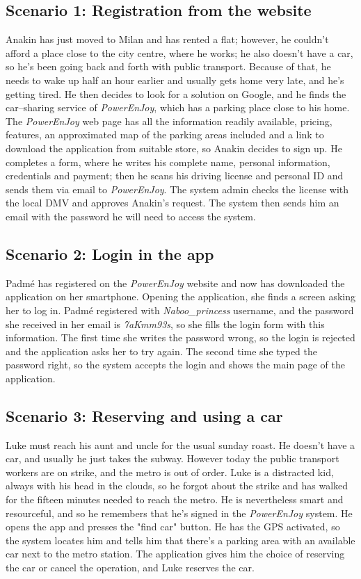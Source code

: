 \subsection{Scenario 1: Registration from the website}
	Anakin has just moved to Milan and has rented a flat; however, he couldn't afford a place close to the city centre, where he works; he also doesn't have a car, so he's been going back and forth with public transport. Because of that, he needs to wake up half an hour earlier and usually gets home very late, and he's getting tired. He then decides to look for a solution on Google, and he finds the car–sharing service of \textit{PowerEnJoy}, which has a parking place close to his home. The \textit{PowerEnJoy} web page has all the information readily available, pricing, features, an approximated map of the parking areas included and a link to download the application from suitable store, so Anakin decides to sign up. He completes a form, where he writes his complete name, personal information, credentials and payment; then he scans his driving license and personal ID and sends them via email to \textit{PowerEnJoy}. The system admin checks the license with the local DMV and approves Anakin's request. The system then sends him an email with the password he will need to access the system.
		
\subsection{Scenario 2: Login in the app} %
	Padmé has registered on the \textit{PowerEnJoy} website and now has downloaded the application on her smartphone. Opening the application, she finds a screen asking her to log in. Padmé registered with \textit{Naboo\_princess} username, and the password she received in her email is \textit{7aKmm93s}, so she fills the login form with this information. The first time she writes the password wrong, so the login is rejected and the application asks her to try again. The second time she typed the password right, so the system accepts the login and shows the main page of the application.
	
\subsection{Scenario 3: Reserving and using a car}
	Luke must reach his aunt and uncle for the usual sunday roast. He doesn't have a car, and usually he just takes the subway. However today the public transport workers are on strike, and the metro is out of order. Luke is a distracted kid, always with his head in the clouds, so he forgot about the strike and has walked for the fifteen minutes needed to reach the metro. He is nevertheless smart and resourceful, and so he remembers that he's signed in the \textit{PowerEnJoy} system. He opens the app and presses the "find car" button. He has the GPS activated, so the system locates him and tells him that there's a parking area with an available car next to the metro station. The application gives him the choice of reserving the car or cancel the operation, and Luke reserves the car. 
	
